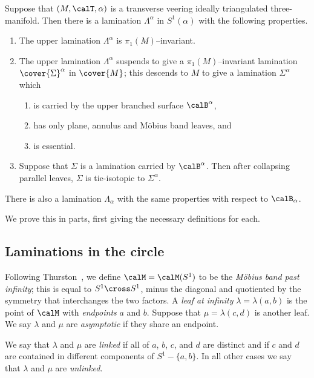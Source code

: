 \documentclass[12pt]{amsart}
\begin{document}
\begin{theorem}
\label{Thm:Laminations}
Suppose that $(M, \calT, \alpha)$ is a transverse veering ideally triangulated three-manifold.  
Then there is a lamination $\Lambda^\alpha$ in $S^1(\alpha)$ with the following properties.
\begin{enumerate}
\item 
\label{Itm:LaminationsInS1}
The upper lamination  $\Lambda^\alpha$ is $\pi_1(M)$--invariant.
\item 
\label{Itm:LaminationsInM}
The upper lamination $\Lambda^\alpha$ suspends to give a $\pi_1(M)$--invariant lamination $\cover{\Sigma}^\alpha$ in $\cover{M}$; this descends to $M$ to give a lamination $\Sigma^\alpha$ which 
\begin{enumerate}
\item
\label{Itm:Carried}
is carried by the upper branched surface $\calB^\alpha$, 
\item
\label{Itm:Types}
has only plane, annulus and M\"obius band leaves, and
\item
\label{Itm:Essential}
is essential.
\end{enumerate}
\item 
\label{Itm:LaminationsUnique}
Suppose that $\Sigma$ is a lamination carried by $\calB^\alpha$.  Then after collapsing parallel leaves, $\Sigma$ is tie-isotopic to $\Sigma^\alpha$.
\end{enumerate}
There is also a lamination $\Lambda_\alpha$ with the same properties with respect to $\calB_\alpha$. 
\end{theorem}

\noindent
We prove this in parts, first giving the necessary definitions for each. 

\subsection{Laminations in the circle}
Following Thurston~\cite[page~187]{thurston_notes}, we define $\calM = \calM(S^1)$ to be the \emph{M\"obius band past infinity}; this is equal to $S^1 \cross S^1$, minus the diagonal and quotiented by the symmetry that interchanges the two factors.  
A \emph{leaf at infinity} $\lambda = \lambda(a, b)$ is the point of $\calM$ with \emph{endpoints} $a$ and $b$.  Suppose that $\mu = \lambda(c, d)$ is another leaf.  We say $\lambda$ and $\mu$ are \emph{asymptotic} if they share an endpoint.  

We say that $\lambda$ and $\mu$ are \emph{linked} if all of $a$, $b$, $c$, and $d$ are distinct and if $c$ and $d$ are contained in different components of $S^1 - \{a, b\}$.  In all other cases we say that $\lambda$ and $\mu$ are \emph{unlinked}.
\end{document}
